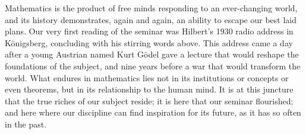 \documentclass{article}
\begin{document}
 
%
%
%
%
%

%

Mathematics is the product of free minds responding to an ever-changing world, and its history demonstrates, again and again, an ability to escape our best laid plans. Our very first reading of the seminar was Hilbert’s 1930 radio address in K{\"o}nigsberg, concluding with his stirring words above. This address came a day after a young Austrian named Kurt G{\"o}del gave a lecture that would reshape the foundations of the subject, and nine years before a war that would transform the world. What endures in mathematics lies not in its institutions or concepts or even theorems, but in its relationship to the human mind. It is at this juncture that the true riches of our subject reside; it is here that our seminar flourished; and   here where our discipline can find inspiration for its future, as it has so often in the past. 
  
%
%

%

%

%

%
%
%
%
%

%

%
%
%
%
%

%

%

%


%

%



%



%

%

%

%



%

%
%
%
%
%
%
%
%
%
%
%
%
%
%
%



%
%
%
%
%
 

%
%


%
%
  
%
%
%
%


 

%
%
%
%

 
 
  
%
%
%

 
   


\end{document}
